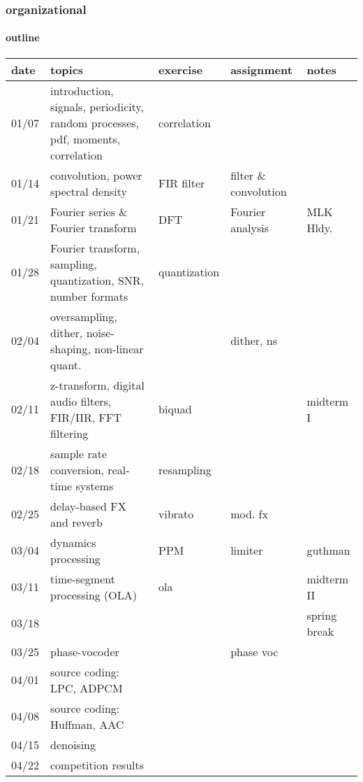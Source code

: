         \begin{frame}\frametitle{organizational}\framesubtitle{outline}
            \vspace{-3mm}
            \begin{scriptsize}
                \begin{tabular}{l|p{.4\linewidth}|p{.1\linewidth}|p{.2\linewidth}||p{.1\linewidth}}
            \textbf{date} & \textbf{topics} & \textbf{exercise} & \textbf{assignment} & \textbf{notes}\\
            \hline\hline
            01/07 & introduction, signals, periodicity, random processes, pdf, moments, correlation & correlation &  &  \\
            01/14 & convolution, power spectral density & FIR filter& filter \& convolution & \\
            01/21 & Fourier series \& Fourier transform& DFT & Fourier analysis & MLK Hldy.\\
            01/28 &Fourier transform, sampling, quantization, SNR, number formats& quantization&& \\
            02/04 &oversampling, dither, noise-shaping, non-linear quant.&&dither, ns  & \\
            02/11 &z-transform, digital audio filters, FIR/IIR, FFT filtering& biquad& & midterm I\\
            02/18 &sample rate conversion, real-time systems &resampling&& \\
            02/25 &delay-based FX and reverb&vibrato& mod. fx&\\
            03/04 &dynamics processing& PPM & limiter & guthman\\
            03/11 &time-segment processing (OLA)&ola&& midterm II \\
            03/18 &&&&spring break \\
            03/25 &phase-vocoder&& phase voc&\\
            04/01 &source coding: LPC, ADPCM&&& \\
            04/08 &source coding: Huffman, AAC&&& \\
            04/15 &denoising&&& \\
            04/22 &competition results&&& \\
                \end{tabular}
            \end{scriptsize}
        \end{frame}

